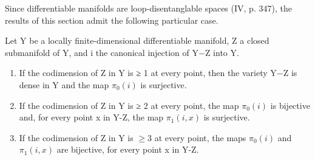 Since differentiable manifolds are loop-disentanglable spaces (IV, p. 347), the results of this section admit the following particular case.

Let Y be a locally finite-dimensional differentiable manifold, Z a closed submanifold of Y, and i the canonical injection of Y−Z into Y.

\begin{enumerate}
\def\labelenumi{\alph{enumi})}
\item
  If the codimension of Z in Y is ≥ 1 at every point, then the variety Y−Z is dense in Y and the map \(\pi_{0}(i)\) is surjective.
\item
  If the codimension of Z in Y is ≥ 2 at every point, the map \(\pi_{0}(i)\) is bijective and, for every point x in Y-Z, the map \(\pi_{1}(i,x)\) is surjective.
\item
  If the codimension of Z in Y is \(\geqslant 3\) at every point, the maps \(\pi_{0}(i)\) and \(\pi_{1}(i,x)\) are bijective, for every point x in Y-Z.
\end{enumerate}

